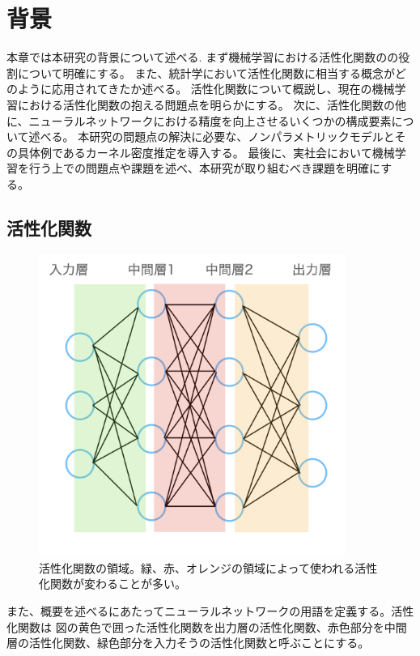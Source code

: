\chapter{背景}
\label{background}

本章では本研究の背景について述べる.
まず機械学習における活性化関数のの役割について明確にする。
また、統計学において活性化関数に相当する概念がどのように応用されてきたか述べる。
活性化関数について概説し、現在の機械学習における活性化関数の抱える問題点を明らかにする。
次に、活性化関数の他に、ニューラルネットワークにおける精度を向上させるいくつかの構成要素について述べる。
本研究の問題点の解決に必要な、ノンパラメトリックモデルとその具体例であるカーネル密度推定を導入する。
最後に、実社会において機械学習を行う上での問題点や課題を述べ、本研究が取り組むべき課題を明確にする。



\section{活性化関数}

\begin{figure}[hbtp]
    \begin{center}
        \includegraphics[width=10cm]{asset/neural_network1.png}
            \caption{活性化関数の領域。緑、赤、オレンジの領域によって使われる活性化関数が変わることが多い。}
            \label{neural_network1}
    \end{center}
\end{figure}

また、概要を述べるにあたってニューラルネットワークの用語を定義する。活性化関数は
図の黄色で囲った活性化関数を出力層の活性化関数、赤色部分を中間層の活性化関数、緑色部分を入力そうの活性化関数と呼ぶことにする。

